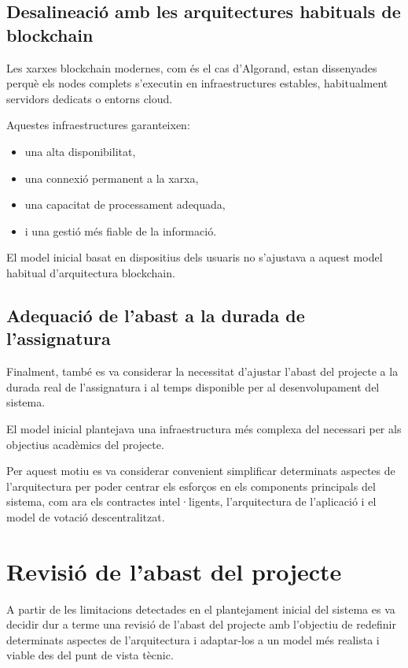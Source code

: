 \documentclass[12pt,a4paper]{article}
\begin{document}
\subsection{Desalineació amb les arquitectures habituals de blockchain}

Les xarxes blockchain modernes, com és el cas d'Algorand, estan dissenyades perquè els nodes complets s'executin en infraestructures estables, habitualment servidors dedicats o entorns cloud.

Aquestes infraestructures garanteixen:

\begin{itemize}
\item una alta disponibilitat,
\item una connexió permanent a la xarxa,
\item una capacitat de processament adequada,
\item i una gestió més fiable de la informació.
\end{itemize}

El model inicial basat en dispositius dels usuaris no s'ajustava a aquest model habitual d'arquitectura blockchain.

\subsection{Adequació de l'abast a la durada de l'assignatura}

Finalment, també es va considerar la necessitat d'ajustar l'abast del projecte a la durada real de l'assignatura i al temps disponible per al desenvolupament del sistema.

El model inicial plantejava una infraestructura més complexa del necessari per als objectius acadèmics del projecte.

Per aquest motiu es va considerar convenient simplificar determinats aspectes de l'arquitectura per poder centrar els esforços en els components principals del sistema, com ara els contractes intel·ligents, l'arquitectura de l'aplicació i el model de votació descentralitzat.


\section{Revisió de l'abast del projecte}

A partir de les limitacions detectades en el plantejament inicial del sistema es va decidir dur a terme una revisió de l'abast del projecte amb l'objectiu de redefinir determinats aspectes de l'arquitectura i adaptar-los a un model més realista i viable des del punt de vista tècnic.
\end{document}
